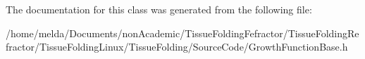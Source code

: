 The documentation for this class was generated from the following file\+:\begin{DoxyCompactItemize}
\item 
/home/melda/\+Documents/non\+Academic/\+Tissue\+Folding\+Fefractor/\+Tissue\+Folding\+Refractor/\+Tissue\+Folding\+Linux/\+Tissue\+Folding/\+Source\+Code/Growth\+Function\+Base.\+h\end{DoxyCompactItemize}
